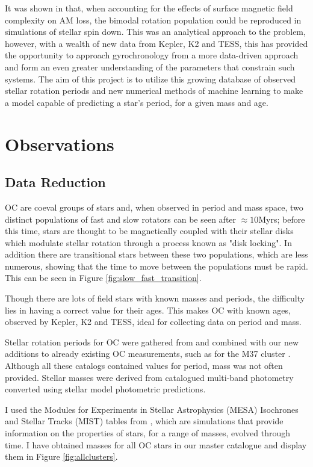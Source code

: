 \documentclass[fleqn,usenatbib]{mnras}
\begin{document}
It was shown in \cite{Garraffo_2018} that, when accounting for the effects of surface magnetic field complexity on AM loss, the bimodal rotation population could be reproduced in simulations of stellar spin down.
This was an analytical approach to the problem, however, with a wealth of new data from Kepler, K2 and TESS, this has provided the opportunity to approach gyrochronology from a more data-driven approach and form an even greater understanding of the parameters that constrain such systems.
The aim of this project is to utilize this growing database of observed stellar rotation periods and new numerical methods of machine learning to make a model capable of predicting a star's period, for a given mass and age.

\section{Observations}
\subsection{Data Reduction}
OC are coeval groups of stars and, when observed in period and mass space, two distinct populations of fast and slow rotators can be seen after $\approx 10$Myrs; before this time, stars are thought to be magnetically coupled with their stellar disks which modulate stellar rotation through a process known as "disk locking". 
In addition there are  transitional stars between these two populations, which are less numerous, showing that the time to move between the populations must be rapid.
This can be seen in Figure \ref{fig:slow_fast_transition}.

Though there are lots of field stars with known masses and periods, the difficulty lies in having a correct value for their ages.
This makes OC with known ages, observed by Kepler, K2 and TESS, ideal for collecting data on period and mass.

Stellar rotation periods for OC were gathered from \cite{beuther2014protostars} and combined with our new additions to already existing OC measurements, such as for the M37 cluster \cite{chang}.
Although all these catalogs contained values for period, mass was not often provided.
Stellar masses were derived from catalogued multi-band photometry converted using stellar model photometric predictions. 

I used the Modules for Experiments in Stellar Astrophysics (MESA) Isochrones and Stellar Tracks (MIST) tables from \cite{Choi_2016}, which are simulations that provide information on the properties of stars, for a range of masses, evolved through time.
I have obtained masses for all OC stars in our master catalogue and display them in Figure \ref{fig:allclusters}.
\end{document}

